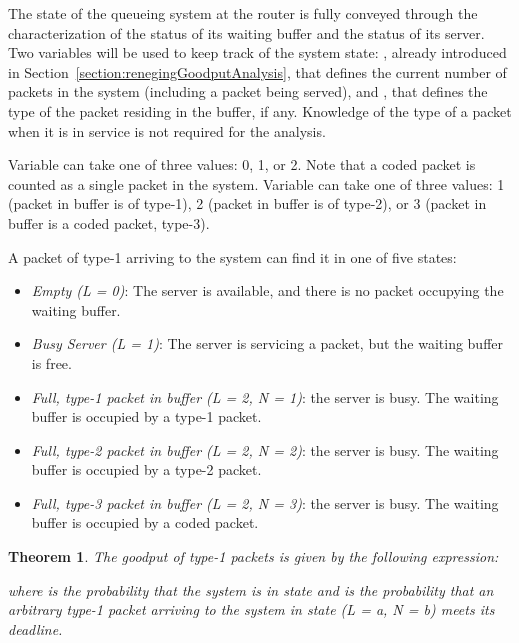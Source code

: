 \documentclass[preprint,12pt]{elsarticle}
\newtheorem{thm}{Theorem}
\theoremstyle{definition}
\theoremstyle{plain}
\theoremstyle{remark}
\begin{document}
The state of the queueing system at the router is fully conveyed through the characterization of the status of its waiting buffer and the status of its server. Two variables will be used to keep track of the system state: , already introduced in Section~\ref{section:renegingGoodputAnalysis}, that defines the current number of packets in the system (including a packet being served), and , that defines the type of the packet residing in the buffer, if any. Knowledge of the type of a packet when it is in service is not required for the analysis.

Variable  can take one of three values: 0, 1, or 2. Note that a coded packet is counted as a single packet in the system. Variable  can take one of three values: 1 (packet in buffer is of type-1), 2 (packet in buffer is of type-2), or 3 (packet in buffer is a coded packet, type-3).

A packet of type-1 arriving to the system can find it in one of five states:
\begin{itemize}
	\item \textit{Empty (L = 0)}: The server is available, and there is no packet occupying the waiting buffer.
	\item \textit{Busy Server (L = 1)}: The server is servicing a packet, but the waiting buffer is free.
	\item \textit{Full, type-1 packet in buffer (L = 2, N = 1)}: the server is busy. The waiting buffer is occupied by a type-1 packet.
	\item \textit{Full, type-2 packet in buffer (L = 2, N = 2)}: the server is busy. The waiting buffer is occupied by a type-2 packet.
	\item \textit{Full, type-3 packet in buffer (L = 2, N = 3)}: the server is busy. The waiting buffer is occupied by a coded packet.
\end{itemize}



\begin{thm} \label{theoremForCoding}
The goodput of type-1 packets is given by the following expression:

where  is the probability that the system is in state  and  is the probability that an arbitrary type-1 packet arriving to the system in state (L = a, N = b) meets its deadline.
\end{thm}
\end{document}
